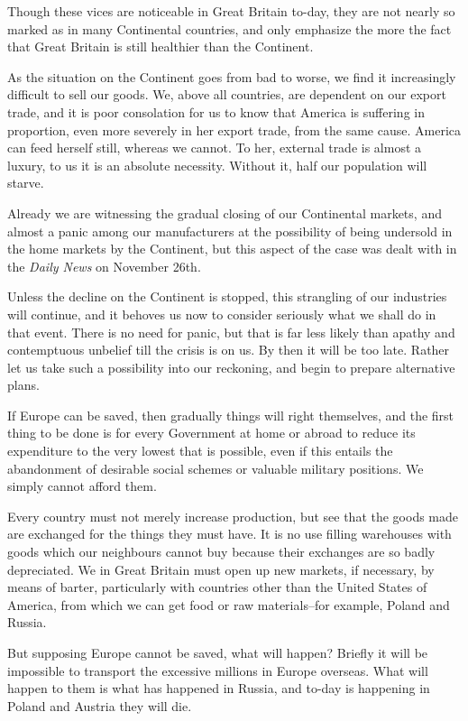 \documentclass{book}
\begin{document}
Though these vices are noticeable in Great Britain to-day, they are not nearly so marked as in many Continental countries, and only emphasize the more the fact that Great Britain is still healthier than the Continent.

As the situation on the Continent goes from bad to worse, we find it increasingly difficult to sell our goods. We, above all countries, are dependent on our export trade, and it is poor consolation for us to know that America is suffering in proportion, even more severely in her export trade, from the same cause. America can feed herself still, whereas we cannot. To her, external trade is almost a luxury, to us it is an absolute necessity. Without it, half our population will starve.

Already we are witnessing the gradual closing of our Continental markets, and almost a panic among our manufacturers at the possibility of being undersold in the home markets by the Continent, but this aspect of the case was dealt with in the \emph{Daily News} on November 26th.

Unless the decline on the Continent is stopped, this strangling of our industries will continue, and it behoves us now to consider seriously what we shall do in that event. There is no need for panic, but that is far less likely than apathy and contemptuous unbelief till the crisis is on us. By then it will be too late. Rather let us take such a possibility into our reckoning, and begin to prepare alternative plans.

If Europe can be saved, then gradually things will right themselves, and the first thing to be done is for every Government at home or abroad to reduce its expenditure to the very lowest that is possible, even if this entails the abandonment of desirable social schemes or valuable military positions. We simply cannot afford them.

Every country must not merely increase production, but see that the goods made are exchanged for the things they must have. It is no use filling warehouses with goods which our neighbours cannot buy because their exchanges are so badly depreciated. We in Great Britain must open up new markets, if necessary, by means of barter, particularly with countries other than the United States of America, from which we can get food or raw materials–for example, Poland and Russia.

But supposing Europe cannot be saved, what will happen? Briefly it will be impossible to transport the excessive millions in Europe overseas. What will happen to them is what has happened in Russia, and to-day is happening in Poland and Austria they will die.
\end{document}
